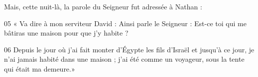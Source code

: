 Mais, cette nuit-là, la parole du Seigneur fut adressée à Nathan :

05 « Va dire à mon serviteur David : Ainsi parle le Seigneur : Est-ce toi qui me bâtiras une maison pour que j’y habite ?

06 Depuis le jour où j’ai fait monter d’Égypte les fils d’Israël et jusqu’à ce jour, je n’ai jamais habité dans une maison ; j’ai été comme un voyageur, sous la tente qui était ma demeure.»

